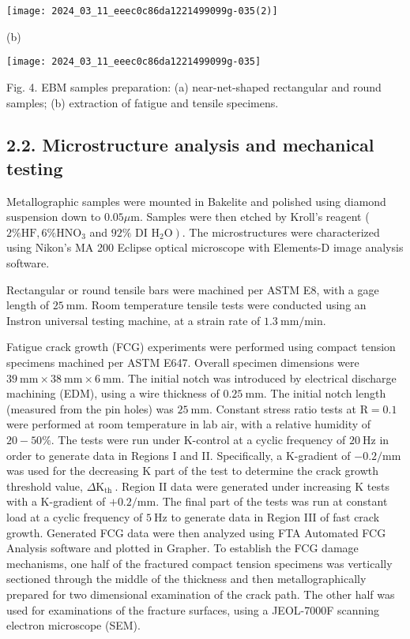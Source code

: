\documentclass[10pt]{article}
\begin{document}
\begin{center}
\texttt{[image: 2024\_03\_11\_eeec0c86da1221499099g-035(2)]}
\end{center}

(b)

\begin{center}
\texttt{[image: 2024\_03\_11\_eeec0c86da1221499099g-035]}
\end{center}

Fig. 4. EBM samples preparation: (a) near-net-shaped rectangular and round samples; (b) extraction of fatigue and tensile specimens.

\subsection*{2.2. Microstructure analysis and mechanical testing}
Metallographic samples were mounted in Bakelite and polished using diamond suspension down to $0.05 \mu \mathrm{m}$. Samples were then etched by Kroll's reagent ( $2 \% \mathrm{HF}, 6 \% \mathrm{HNO}_{3}$ and $92 \%$ DI $\left.\mathrm{H}_{2} \mathrm{O}\right)$. The microstructures were characterized using Nikon's MA 200 Eclipse optical microscope with Elements-D image analysis software.

Rectangular or round tensile bars were machined per ASTM E8, with a gage length of $25 \mathrm{~mm}$. Room temperature tensile tests were conducted using an Instron universal testing machine, at a strain rate of $1.3 \mathrm{~mm} / \mathrm{min}$.

Fatigue crack growth (FCG) experiments were performed using compact tension specimens machined per ASTM E647. Overall specimen dimensions were $39 \mathrm{~mm} \times 38 \mathrm{~mm} \times 6 \mathrm{~mm}$. The initial notch was introduced by electrical discharge machining (EDM), using a wire thickness of $0.25 \mathrm{~mm}$. The initial notch length (measured from the pin holes) was $25 \mathrm{~mm}$. Constant stress ratio tests at $\mathrm{R}=0.1$ were performed at room temperature in lab air, with a relative humidity of $20-50 \%$. The tests were run under K-control at a cyclic frequency of $20 \mathrm{~Hz}$ in order to generate data in Regions I and II. Specifically, a K-gradient of $-0.2 / \mathrm{mm}$ was used for the decreasing K part of the test to determine the crack growth threshold value, $\Delta \mathrm{K}_{\text {th }}$. Region II data were generated under increasing $\mathrm{K}$ tests with a $\mathrm{K}$-gradient of $+0.2 / \mathrm{mm}$. The final part of the tests was run at constant load at a cyclic frequency of $5 \mathrm{~Hz}$ to generate data in Region III of fast crack growth. Generated FCG data were then analyzed using FTA Automated FCG Analysis software and plotted in Grapher. To establish the FCG damage mechanisms, one half of the fractured compact tension specimens was vertically sectioned through the middle of the thickness and then metallographically prepared for two dimensional examination of the crack path. The other half was used for examinations of the fracture surfaces, using a JEOL-7000F scanning electron microscope (SEM).
\end{document}
